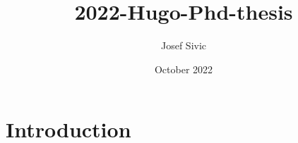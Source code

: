 \documentclass{article}
\title{2022-Hugo-Phd-thesis}
\author{Josef Sivic}
\date{October 2022}
\begin{document}
\maketitle

\section{Introduction}
\end{document}
